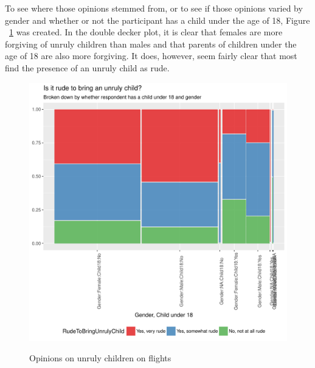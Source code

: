 \documentclass[DIV=calc, paper=a4, fontsize=10pt, twocolumn]{scrartcl}	 %
\begin{document}
\par To see where those opinions stemmed from, or to see if those opinions varied by gender and whether or not the participant has a child under the age of 18, Figure ~\ref{fig: child2} was created. In the double decker plot, it is clear that females are more forgiving of unruly children than males and that parents of children under the age of 18 are also more forgiving. It does, however, seem fairly clear that most find the presence of an unruly child as rude.

\begin{figure}[h!]
\caption{Opinions on unruly children on flights}
\centering
\includegraphics{flying-child2}
\label{fig: child2}
\end{figure}
\end{document}
